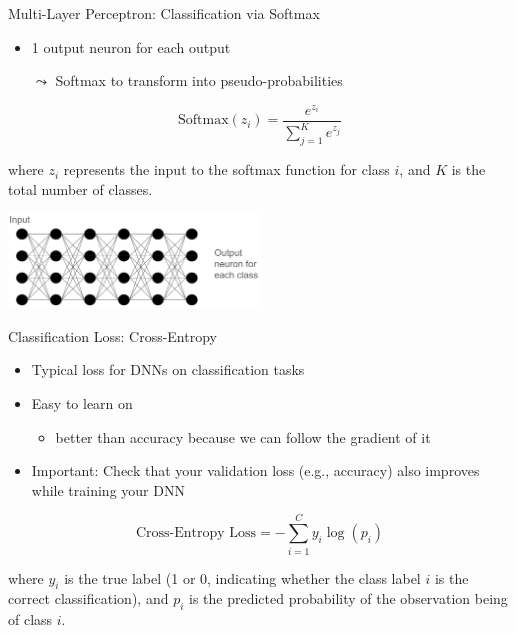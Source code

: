 \documentclass[aspectratio=169]{../latex_main/tntbeamer}  %
\begin{document}
  	\begin{frame}{Multi-Layer Perceptron: Classification via Softmax}

        \begin{itemize}
            \item 1 output neuron for each output
            \item[$\leadsto$] Softmax to transform into pseudo-probabilities
        \end{itemize}

        \[
        \text{Softmax}(z_i) = \frac{e^{z_i}}{\sum_{j=1}^{K} e^{z_j}}
        \]
        
        where \( z_i \) represents the input to the softmax function for class \( i \), and \( K \) is the total number of classes.

        \centering
        \includegraphics[width=0.5\textwidth]{figure/mlp2.png}
                
	\end{frame}

  	\begin{frame}{Classification Loss: Cross-Entropy}

        \begin{itemize}
            \item Typical loss for DNNs on classification tasks
            \item Easy to learn on 
            \begin{itemize}
                \item better than accuracy because we can follow the gradient of it 
            \end{itemize}
            \item Important: Check that your validation loss (e.g., accuracy) also improves while training your DNN
        \end{itemize}

        \[
        \text{Cross-Entropy Loss} = -\sum_{i=1}^{C} y_i \log(p_i)
        \]
        
        where \( y_i \) is the true label (1 or 0, indicating whether the class label \( i \) is the correct classification), and \( p_i \) is the predicted probability of the observation being of class \( i \).
                
	\end{frame}

 	
\end{document}
